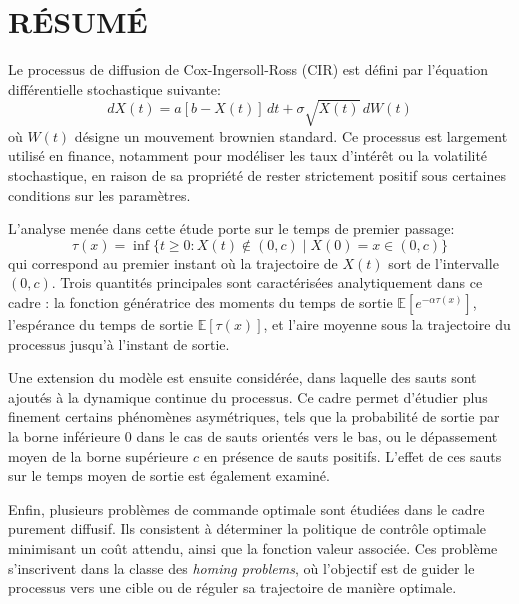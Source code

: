 %
\chapter*{RÉSUMÉ}\thispagestyle{headings}

Le processus de diffusion de Cox-Ingersoll-Ross (CIR) est défini par l'équation différentielle stochastique suivante:
\[
dX(t) = a[b - X(t)]\,dt + \sigma \sqrt{X(t)}\,dW(t)
\]
où \(W(t)\) désigne un mouvement brownien standard. Ce processus est largement utilisé en finance, notamment pour modéliser les taux d'intérêt ou la volatilité stochastique, en raison de sa propriété de rester strictement positif sous certaines conditions sur les paramètres.

L'analyse menée dans cette étude porte sur le temps de premier passage:
\[
\tau(x) = \inf\{ t \geq 0 : X(t) \notin (0, c) \mid X(0) = x \in (0, c) \}
\]
qui correspond au premier instant où la trajectoire de \(X(t)\) sort de l'intervalle \((0,c)\). Trois quantités principales sont caractérisées analytiquement dans ce cadre : la fonction génératrice des moments du temps de sortie \( \mathds{E}[e^{-\alpha \tau(x)}] \), l'espérance du temps de sortie \( \mathds{E}[\tau(x)] \), et l'aire moyenne sous la trajectoire du processus jusqu'à l'instant de sortie.

Une extension du modèle est ensuite considérée, dans laquelle des sauts sont ajoutés à la dynamique continue du processus. Ce cadre permet d'étudier plus finement certains phénomènes asymétriques, tels que la probabilité de sortie par la borne inférieure \(0\) dans le cas de sauts orientés vers le bas, ou le dépassement moyen de la borne supérieure \(c\) en présence de sauts positifs. L'effet de ces sauts sur le temps moyen de sortie est également examiné.

Enfin, plusieurs problèmes de commande optimale sont étudiées dans le cadre purement diffusif. Ils consistent à déterminer la politique de contrôle optimale minimisant un coût attendu, ainsi que la fonction valeur associée. Ces problème s'inscrivent dans la classe des \textit{homing problems}, où l'objectif est de guider le processus vers une cible ou de réguler sa trajectoire de manière optimale.